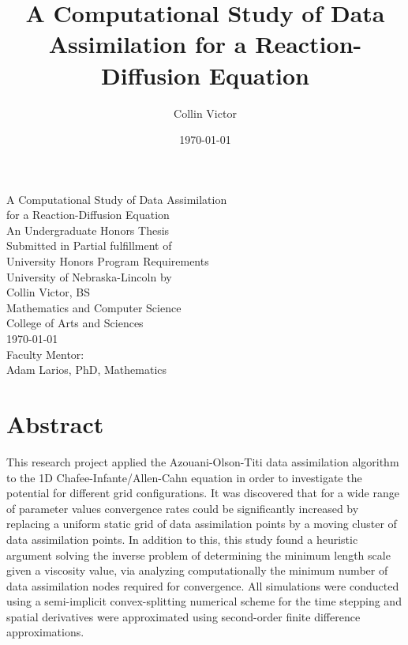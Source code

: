 \documentclass[12pt]{amsart}
\title[Data Assimilation for Reaction-Diffusion]{A Computational Study of Data Assimilation for a Reaction-Diffusion Equation}
\date{\today}
\author{Collin Victor}
\theoremstyle{plain}
\theoremstyle{definition}
\theoremstyle{remark}
\numberwithin{equation}{section} %
\numberwithin{figure}{section}   %
\begin{document}
	\doublespacing
\begin{titlepage}
	\begin{center}
		\vspace{3cm}\large
	A Computational Study of Data Assimilation\\ for a Reaction-Diffusion Equation\\

		\vspace{3cm}
		\normalsize
		An Undergraduate Honors Thesis\\
		Submitted in Partial fulfillment of\\
		University Honors Program Requirements\\
		University of Nebraska-Lincoln
		\vspace{3cm}
		by\\
	Collin Victor, BS\\
		Mathematics and Computer Science\\
		College of Arts and Sciences\\
\vfill
		\today\\
		\vspace{3cm}
		Faculty Mentor:\\
		Adam Larios, PhD, Mathematics\\
		\vspace*{3cm}
		
		
	\end{center}
\end{titlepage}
\section*{Abstract}\label{abstract}
This research project applied the  Azouani-Olson-Titi data assimilation algorithm to the 1D Chafee-Infante/Allen-Cahn equation in order to investigate the potential for different grid configurations. It was discovered that for a wide range of parameter values convergence rates could be significantly increased by replacing a uniform static grid of data assimilation points by a moving cluster of data assimilation points. In addition to this, this study found a heuristic argument solving the inverse problem of determining the minimum length scale given a viscosity value, via analyzing computationally the minimum number of data assimilation nodes required for convergence. All simulations were conducted using a semi-implicit convex-splitting numerical scheme for the time stepping and spatial derivatives were approximated using second-order finite difference approximations. 
\end{document}
